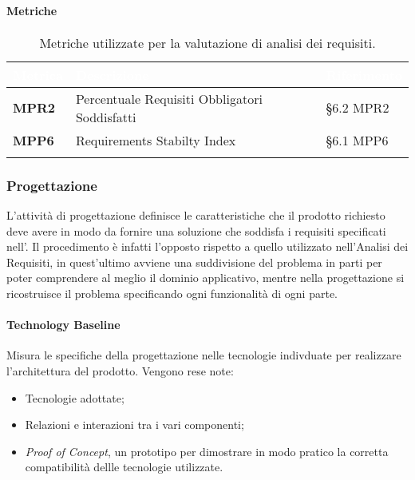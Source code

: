\paragraph{Metriche}
\setlength{\freewidth}{\dimexpr\textwidth-0\tabcolsep}
\renewcommand{\arraystretch}{1.5}
\setlength{\aboverulesep}{0pt}
\setlength{\belowrulesep}{0pt}
\begin{longtable}{L{.22\freewidth} L{.4\freewidth} L{.2\freewidth}}
	\toprule
	\textcolor{white}{\textbf{Metrica}}&
	\textcolor{white}{\textbf{Descrizione}}&	
	\textcolor{white}{\textbf{Riferimento}}\\	
	\toprule
	\endhead
	
	\textbf{MPR2} & Percentuale Requisiti Obbligatori Soddisfatti & \S 6.2 MPR2 \\
	\textbf{MPP6} & Requirements Stabilty Index & \S 6.1 MPP6 \\
	
	\bottomrule
	\caption*{Metriche utilizzate per la valutazione di analisi dei requisiti.}
\end{longtable}

\subsubsection{Progettazione} 
L'attività di progettazione definisce le caratteristiche che il prodotto richiesto deve avere in modo da fornire una soluzione che soddisfa i requisiti specificati nell'\AdR{}.
Il procedimento è infatti l'opposto rispetto a quello utilizzato nell'Analisi dei Requisiti, in quest'ultimo avviene una suddivisione del problema in parti
per poter comprendere al meglio il dominio applicativo, mentre nella progettazione si ricostruisce il problema specificando ogni funzionalità di ogni parte.

\paragraph{Technology Baseline}
Misura le specifiche della progettazione nelle tecnologie indivduate per realizzare l'architettura del prodotto. Vengono rese note:
\begin{itemize}
	\item Tecnologie adottate;
	\item Relazioni e interazioni tra i vari componenti;
	\item {\textit{Proof of Concept}}, un prototipo per dimostrare in modo pratico la corretta compatibilità  dellle tecnologie utilizzate.
\end{itemize}

